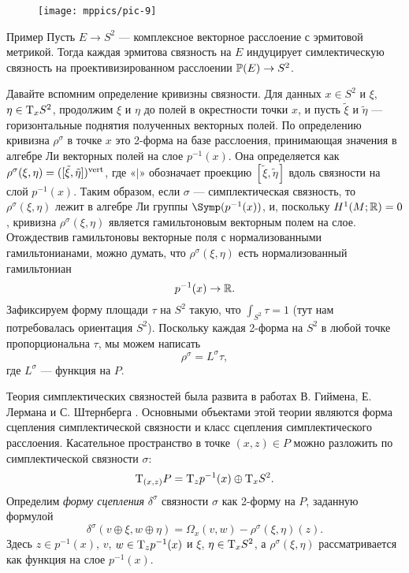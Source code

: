 {

\begin{wrapfigure}[12]{o}{40 mm}
\vskip-0mm
\centering
\texttt{[image: mppics/pic-9]}
\caption{}\label{pic-9}
\vskip0mm
\end{wrapfigure}

\begin{ex*}{Пример}
Пусть $E \to S^2$ — комплексное векторное расслоение с эрмитовой метрикой.
Тогда каждая эрмитова связность на $E$ индуцирует симлектическую связность на проективизированном расслоении $\PP(E)\z\to S^2$.
\end{ex*}

Давайте вспомним определение кривизны связности.
Для данных $x\in S^2$ и $\xi$, $\eta \z\in \T_x S^2$, продолжим $\xi$
и $\eta$ до полей в окрестности точки $x$, 
и пусть $\tilde\xi$ и $\tilde\eta$ — горизонтальные поднятия
полученных векторных полей. 
По определению кривизна $\rho^\sigma$ в точке $x$ это 2-форма на
базе расслоения,
принимающая значения в алгебре Ли векторных полей на слое
$p^{-1}(x)$. 
Она определяется как $\rho^\sigma (\xi, \eta) \z= ([\tilde\xi,
  \tilde\eta])^\vert$, где «$\vert$» обозначает проекцию $[\tilde\xi,
  \tilde\eta]$ вдоль связности на слой $p^{-1} (x)$. 
Таким образом, если $\sigma$ — симплектическая связность, то
$\rho^\sigma (\xi, \eta)$ лежит в алгебре Ли группы
$\Symp(p^{-1}(x))$, и, поскольку $H^1 (M;\mathbb{R}) = 0$, кривизна
$\rho^\sigma (\xi, \eta)$ является гамильтоновым векторным полем на
слое. 
Отождествив гамильтоновы векторные поля с нормализованными
гамильтонианами, можно думать, что $\rho^\sigma (\xi, \eta)$ есть
нормализованный гамильтониан 
\[p^{-1} (x) \to \mathbb{R}.\]
Зафиксируем форму площади $\tau$ на $S^2$ такую, что $\int_{S^2} \tau
= 1$ (тут нам потребовалась ориентация $S^2$). 
Поскольку каждая 2-форма на $S^2$ в любой точке
пропорциональна $\tau$, мы можем написать
\[\rho^\sigma = L^\sigma \tau,\]
где $L^\sigma$ — функция на $P$.

}

Теория симплектических связностей была развита в работах
В. Гиймена,
Е. Лермана
и С. Штернберга \cite{GLS,MS}. 
Основными объектами этой теории являются форма сцепления
симплектической связности и класс сцепления симплектического
расслоения.  
Касательное пространство в точке $(x, z) \in P$ можно разложить по симплектической
связности $\sigma$: 
\[\mathrm{T}_{(x,z)} P = \mathrm{T}_z p^{-1} (x) \oplus \mathrm{T}_x S^2.\]
Определим \emph{форму сцепления} $\delta^\sigma$ связности $\sigma$
как 2-форму на $P$, заданную формулой  
\[\delta^\sigma (v \oplus \xi, w \oplus \eta) = \Omega_x (v, w) -
\rho^\sigma (\xi, \eta)(z).\] 
Здесь $z \in p^{-1} (x)$, $v$, $w \in \mathrm{T}_z p^{-1} (x)$ и $\xi$, $\eta
\in \mathrm{T}_x S^2$, а $\rho^\sigma (\xi, \eta)$ рассматривается как функция
на слое $p^{-1} (x)$. 

